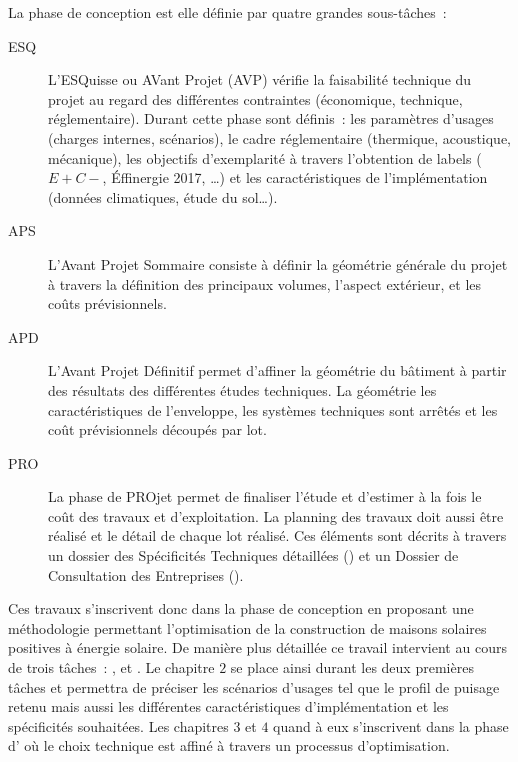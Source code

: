 La phase de conception est elle définie par quatre grandes sous-tâches~:
\begin{description}
    \item [\textsf{ESQ}] L’ESQuisse ou AVant Projet (\textsf{AVP}) vérifie la faisabilité technique du projet au regard
          des différentes contraintes (économique, technique, réglementaire). Durant cette
          phase sont définis~: les paramètres d’usages
          (charges internes, scénarios), le cadre réglementaire (thermique, acoustique, mécanique),
          les objectifs d’exemplarité à travers l’obtention de labels ($E+C-$,
           Éffinergie 2017, \dots) et les caractéristiques de l’implémentation
          (données climatiques, étude du sol\dots).
    \item [\textsf{APS}] L’Avant Projet Sommaire consiste à définir la géométrie générale
          du projet à travers la définition des principaux volumes, l’aspect extérieur,
          et les coûts prévisionnels.
    \item [\textsf{APD}] L’Avant Projet Définitif permet d’affiner la géométrie du bâtiment
          à partir des résultats des différentes études techniques. La géométrie
          les caractéristiques de l’enveloppe, les systèmes techniques sont
          arrêtés et les coût prévisionnels découpés par lot.
    \item [\textsf{PRO}] La phase de PROjet permet de finaliser l’étude et d’estimer
           à la fois le coût des travaux et d’exploitation. La planning des travaux
           doit aussi être réalisé et le détail de chaque lot réalisé. Ces éléments
           sont décrits à travers un dossier des Spécificités Techniques
           détaillées () et un Dossier de Consultation des Entreprises ().
\end{description}

Ces travaux s’inscrivent donc dans la phase de conception en proposant une méthodologie
permettant l’optimisation de la construction de maisons solaires positives à énergie solaire.
De manière plus détaillée ce travail intervient au cours de trois tâches~: , 
et . Le chapitre $2$ se place ainsi durant les deux premières tâches
et permettra de préciser les scénarios d’usages tel que le profil de
puisage retenu mais aussi les différentes caractéristiques d’implémentation et les
spécificités souhaitées. Les chapitres $3$ et $4$ quand à eux s’inscrivent dans la phase
d’ où le choix technique est affiné à travers un processus d’optimisation.

